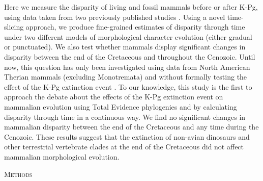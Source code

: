 \documentclass[12pt,letterpaper]{article}
\renewcommand{\section}[1]{%
\bigskip
\begin{center}
\begin{Large}
\normalfont\scshape #1
\medskip
\end{Large}
\end{center}}
\begin{document}
Here we measure the disparity of living and fossil mammals before or after K-Pg, using data taken from two previously published studies \citep{Slater2012MEE,beckancient2014}. 
Using a novel time-slicing approach, we produce fine-grained estimates of disparity through time under two different models of morphological character evolution (either gradual or punctuated). 
We also test whether mammals display significant changes in disparity between the end of the Cretaceous and throughout the Cenozoic.
Until now, this question has only been investigated using data from North American Therian mammals (excluding Monotremata) and without formally testing the effect of the K-Pg extinction event \citep{Wilson2013}.
To our knowledge, this study is the first to approach the debate about the effects of the K-Pg extinction event on mammalian evolution using Total Evidence phylogenies and by calculating disparity through time in a continuous way. %
We find no significant changes in mammalian disparity between the end of the Cretaceous and any time during the Cenozoic. %
These results suggest that the extinction of non-avian dinosaurs and other terrestrial vertebrate clades at the end of the Cretaceous did not affect mammalian morphological evolution.

%
%

\section{Methods}
\end{document}
